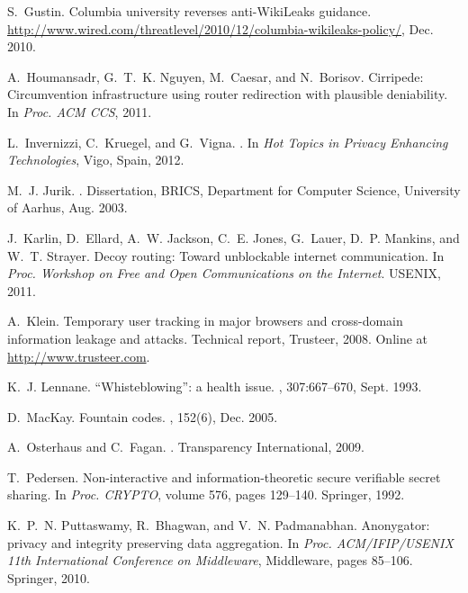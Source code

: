 \documentclass[twocolumn,10pt]{article}
\begin{document}
\begin{thebibliography}{10}
S.~Gustin.
\newblock Columbia university reverses anti-{WikiLeaks} guidance.
\newblock
  \url{http://www.wired.com/threatlevel/2010/12/columbia-wikileaks-policy/},
  Dec. 2010.

A.~Houmansadr, G.~T.~K. Nguyen, M.~Caesar, and N.~Borisov.
\newblock Cirripede: Circumvention infrastructure using router redirection with
  plausible deniability.
\newblock In {\em Proc. ACM CCS}, 2011.

L.~Invernizzi, C.~Kruegel, and G.~Vigna.
.
\newblock In {\em Hot Topics in Privacy Enhancing Technologies}, Vigo, Spain,
  2012.

M.~J. Jurik.
.
\newblock Dissertation, BRICS, Department for Computer Science, University of
  Aarhus, Aug. 2003.

J.~Karlin, D.~Ellard, A.~W. Jackson, C.~E. Jones, G.~Lauer, D.~P. Mankins, and
  W.~T. Strayer.
\newblock Decoy routing: Toward unblockable internet communication.
\newblock In {\em Proc. Workshop on Free and Open Communications on the
  Internet}. USENIX, 2011.

A.~Klein.
\newblock Temporary user tracking in major browsers and cross-domain
  information leakage and attacks.
\newblock Technical report, Trusteer, 2008.
\newblock Online at \url{http://www.trusteer.com}.

K.~J. Lennane.
\newblock ``{Whisteblowing}'': a health issue.
, 307:667--670, Sept. 1993.

D.~MacKay.
\newblock Fountain codes.
, 152(6), Dec. 2005.

A.~Osterhaus and C.~Fagan.
.
\newblock Transparency International, 2009.

T.~Pedersen.
\newblock Non-interactive and information-theoretic secure verifiable secret
  sharing.
\newblock In {\em Proc. CRYPTO}, volume 576, pages 129--140. Springer, 1992.

K.~P.~N. Puttaswamy, R.~Bhagwan, and V.~N. Padmanabhan.
\newblock Anonygator: privacy and integrity preserving data aggregation.
\newblock In {\em Proc. ACM/IFIP/USENIX 11th International Conference on
  Middleware}, Middleware, pages 85--106. Springer, 2010.


\end{thebibliography}
\end{document}
